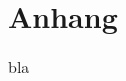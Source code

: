\section{Anhang}
\label{sec:Anhang}

\begin{table}
    \centering
    \caption{bla}
    \label{tab:bla}
    \begin{tabular}{S S S S}
        \toprule

        \midrule

        \bottomrule

    \end{tabular}
\end{table}
